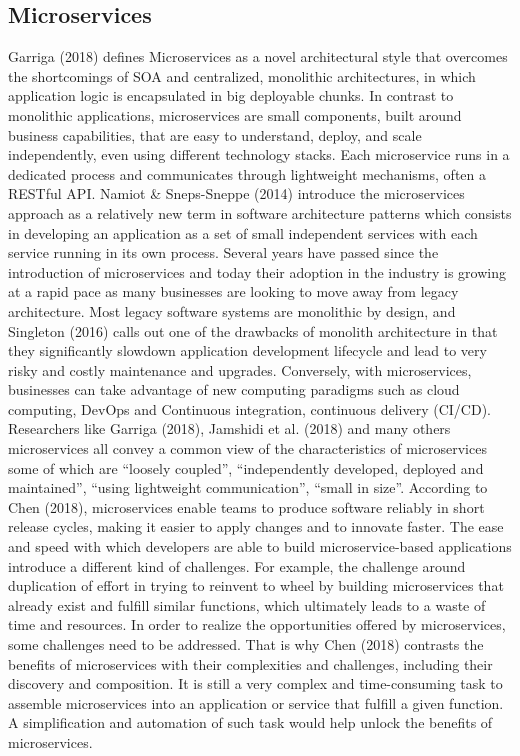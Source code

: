 \documentclass{article}
\begin{document}
\begin{multicols}{2}
 \subsection{Microservices}
Garriga (2018) defines Microservices as a novel architectural style that overcomes the shortcomings of SOA and centralized, monolithic architectures, in which application logic is encapsulated in big deployable chunks. In contrast to monolithic applications, microservices are small components, built around business capabilities, that are easy to understand, deploy, and scale independently, even using different technology stacks. Each microservice runs in a dedicated process and communicates through lightweight mechanisms, often a RESTful API. 
Namiot \& Sneps-Sneppe (2014) introduce the microservices approach as a relatively new term in software architecture patterns which consists in developing an application as a set of small independent services with each service running in its own process. Several years have passed since the introduction of microservices and today their adoption in the industry is growing at a rapid pace as many businesses are looking to move away from legacy architecture. Most legacy software systems are monolithic by design, and Singleton (2016) calls out one of the drawbacks of monolith architecture in that they significantly slowdown application development lifecycle and lead to very risky and costly maintenance and upgrades. Conversely, with microservices, businesses can take advantage of new computing paradigms such as cloud computing, DevOps and Continuous integration, continuous delivery (CI/CD). 
Researchers like Garriga (2018), Jamshidi et al. (2018) and many others microservices all convey a common view of the characteristics of microservices some of which are “loosely coupled”, “independently developed, deployed and maintained”, “using lightweight communication”, “small in size”. According to Chen (2018), microservices enable teams to produce software reliably in short release cycles, making it easier to apply changes and to innovate faster. The ease and speed with which developers are able to build microservice-based applications introduce a different kind of challenges. For example, the challenge around duplication of effort in trying to reinvent to wheel by building microservices that already exist and fulfill similar functions, which ultimately leads to a waste of time and resources. 
In order to realize the opportunities offered by microservices, some challenges need to be addressed. That is why Chen (2018) contrasts the benefits of microservices with their complexities and challenges, including their discovery and composition. It is still a very complex and time-consuming task to assemble microservices into an application or service that fulfill a given function. A simplification and automation of such task would help unlock the benefits of microservices.



\end{multicols}
\end{document}
